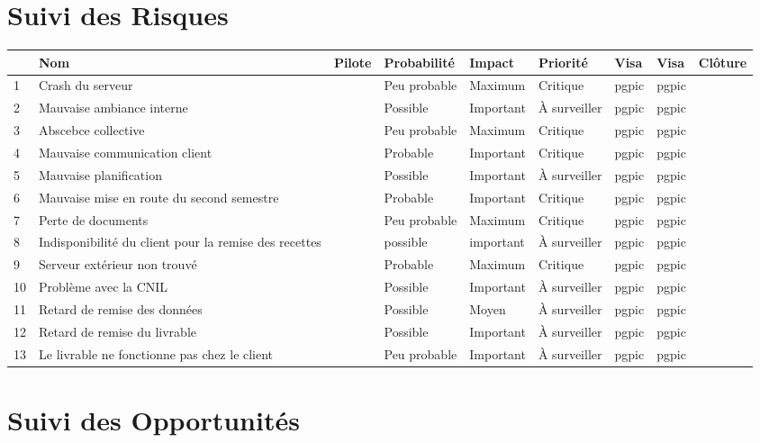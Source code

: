 \documentclass[asi]{picINSA}
\begin{document}
\chapter*{Suivi des Risques}
\begin{longtable}{|p{0.3cm}|p{2.5cm}|p{2cm}|p{2cm}|p{1.8cm}|p{1.5cm}|p{1cm}|p{1cm}|p{1.5cm}|}
			\hline
			\rowcolor{gray!40}
			\No & Nom & Pilote & Probabilité & Impact & Priorité & Visa \RQCourt{} & Visa \CPCourt{} & Clôture \\\hline
			 1 & Crash du serveur & \Matthieu & Peu probable & Maximum & Critique & pgpic & pgpic & \\\hline
			 2 & Mauvaise ambiance interne & \Michel & Possible & Important & À surveiller & pgpic & pgpic & \\\hline
			 3 & Abscebce collective & \Pierre & Peu probable & Maximum & Critique & pgpic & pgpic & \\\hline
			 4 & Mauvaise communication client & \Julie & Probable & Important & Critique & pgpic & pgpic & \\\hline
			 5 & Mauvaise planification & \Florian & Possible & Important & À surveiller & pgpic & pgpic & \\\hline
			 6 & Mauvaise mise en route du second semestre & \Melissa & Probable & Important & Critique & pgpic & pgpic & \\\hline
			 7 & Perte de documents & \Mathieu & Peu probable & Maximum & Critique & pgpic & pgpic & \\\hline
			 8 & Indisponibilité du client pour la remise des recettes & \Julie & possible & important & À surveiller & pgpic & pgpic & \\\hline
			 9 & Serveur extérieur non trouvé & \Matthieu & Probable & Maximum & Critique & pgpic & pgpic & \\\hline
			 10 & Problème avec la CNIL & \Pierre & Possible & Important & À surveiller & pgpic & pgpic & \\\hline
			 11 & Retard de remise des données & \Sergi & Possible & Moyen & À surveiller & pgpic & pgpic & \\\hline
			 12 & Retard de remise du livrable & \Kafui & Possible & Important & À surveiller & pgpic & pgpic & \\\hline
			 13 & Le livrable ne fonctionne pas chez le client & \Melissa & Peu probable & Important & À surveiller & pgpic & pgpic & \\\hline
\end{longtable}

\chapter*{Suivi des Opportunités}
\end{document}
